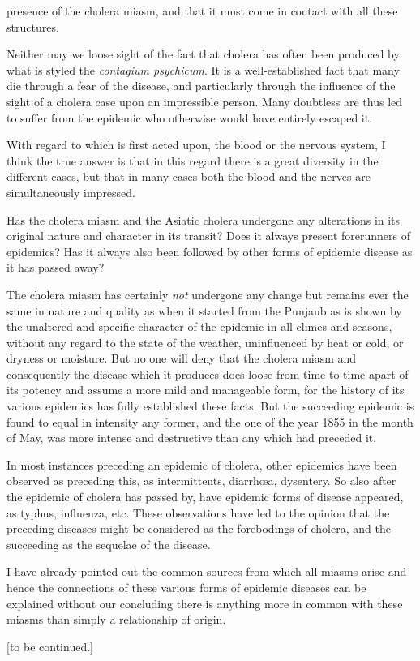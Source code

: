 presence of the cholera miasm, and that it must come in contact with
all these structures.

Neither may we loose sight of the fact that cholera has often been
produced by what is styled the \emph{contagium psychicum}. It is a well-established
fact that many die through a fear of the disease, and particularly
through the influence of the sight of a cholera case upon an
impressible person. Many doubtless are thus led to suffer from the
epidemic who otherwise would have entirely escaped it.

With regard to which is first acted upon, the blood or the nervous
system, I think the true answer is that in this regard there is a great
diversity in the different cases, but that in many cases both the blood
and the nerves are simultaneously impressed.

\vspace{\baselineskip}

Has the cholera miasm and the Asiatic cholera undergone any alterations
in its original nature and character in its transit? Does it always
present forerunners of epidemics? Has it always also been followed by
other forms of epidemic disease as it has passed away?

The cholera miasm has certainly \emph{not} undergone any change but remains
ever the same in nature and quality as when it started from the
Punjaub as is shown by the unaltered and specific character of the epidemic
in all climes and seasons, without any regard to the state of the
weather, uninfluenced by heat or cold, or dryness or moisture. But no
one will deny that the cholera miasm and consequently the disease
which it produces does loose from time to time apart of its potency and
assume a more mild and manageable form, for the history of its various
epidemics has fully established these facts. But the succeeding epidemic
is found to equal in intensity any former, and the one of the year
1855 in the month of May, was more intense and destructive than any
which had preceded it.

In most instances preceding an epidemic of cholera, other epidemics
have been observed as preceding this, as intermittents, diarrhœa, dysentery.
So also after the epidemic of cholera has passed by, have
epidemic forms of disease appeared, as typhus, influenza, etc. These
observations have led to the opinion that the preceding diseases might
be considered as the forebodings of cholera, and the succeeding as the
sequelae of the disease.

I have already pointed out the common sources from which all
miasms arise and hence the connections of these various forms of epidemic
diseases can be explained without our concluding there is anything
more in common with these miasms than simply a relationship
of origin.

[to be continued.]\endinput
